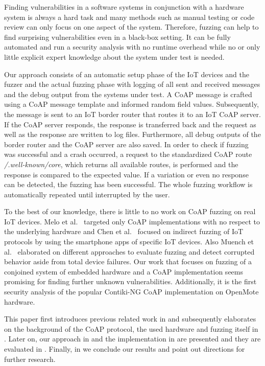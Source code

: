 Finding vulnerabilities in a software systems in conjunction with a hardware system is always a hard task and many methods such as manual testing or code review can only focus on one aspect of the system. Therefore, fuzzing can help to find surprising vulnerabilities even in a black-box setting. It can be fully automated and run a security analysis with no runtime overhead while no or only little explicit expert knowledge about the system under test is needed.

Our approach consists of an automatic setup phase of the IoT devices and the fuzzer and the actual fuzzing phase with logging of all sent and received messages and the debug output from the systems under test. A CoAP message is crafted using a CoAP message template and informed random field values. Subsequently, the message is sent to an IoT border router that routes it to an IoT CoAP server. If the CoAP server responds, the response is transferred back and the request as well as the response are written to log files. Furthermore, all debug outputs of the border router and the CoAP server are also saved. In order to check if fuzzing was successful and a crash occurred, a request to the standardized CoAP route \textit{/.well-known/core}, which returns all available routes, is performed and the response is compared to the expected value. If a variation or even no response can be detected, the fuzzing has been successful. The whole fuzzing workflow is automatically repeated until interrupted by the user.

To the best of our knowledge, there is little to no work on CoAP fuzzing on real IoT devices. Melo et al.~\cite{Melo2017RobustnessTO} targeted only CoAP implementations with no respect to the underlying hardware and Chen et al.~\cite{chen2018ndss} focused on indirect fuzzing of IoT protocols by using the smartphone apps of specific IoT devices. Also Muench et al.~\cite{EURECOM+5417} elaborated on different approaches to evaluate fuzzing and detect corrupted behavior aside from total device failures. Our work that focuses on fuzzing of a conjoined system of embedded hardware and a CoAP implementation seems promising for finding further unknown vulnerabilities. Additionally, it is the first security analysis of the popular Contiki-NG CoAP implementation on OpenMote hardware.

This paper first introduces previous related work in  and subsequently elaborates on the background of the CoAP protocol, the used hardware and fuzzing itself in . Later on, our approach in  and the implementation in  are presented and they are evaluated in . Finally, in  we conclude our results and point out directions for further research.
